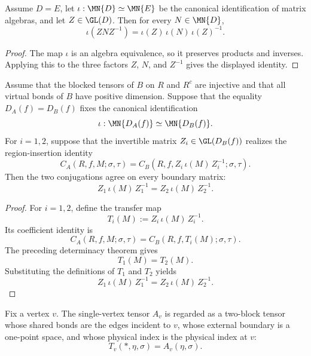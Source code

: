 \begin{theorem}
    \label{thm:peps_reindexAlgEquiv_gaugeConj}
    \leanok
    Assume \(D=E\), let \(\iota:\MN{D}\simeq\MN{E}\) be the canonical
    identification of matrix algebras, and let \(Z\in\GL(D)\).  Then for every
    \(N\in\MN{D}\),
    \[
        \iota(ZNZ^{-1})
        =
        \iota(Z)\,\iota(N)\,\iota(Z)^{-1}.
    \]
\end{theorem}
\begin{proof}\leanok
    The map \(\iota\) is an algebra equivalence, so it preserves products and
    inverses.  Applying this to the three factors \(Z\), \(N\), and \(Z^{-1}\)
    gives the displayed identity.
\end{proof}

\begin{theorem}
    \label{thm:peps_gaugeConj_eq_of_coeffIdentities}
    \leanok
    Assume that the blocked tensors of \(B\) on \(R\) and \(R^c\) are injective
    and that all virtual bonds of \(B\) have positive dimension.  Suppose that
    the equality \(D_A(f)=D_B(f)\) fixes the canonical identification
    \[
        \iota:\MN{D_A(f)}\simeq\MN{D_B(f)}.
    \]
    For \(i=1,2\), suppose that the invertible matrix \(Z_i\in\GL(D_B(f))\)
    realizes the region-insertion identity
    \[
        C_A(R,f,M;\sigma,\tau)
        =
        C_B(R,f,Z_i\,\iota(M)\,Z_i^{-1};\sigma,\tau).
    \]
    Then the two conjugations agree on every boundary matrix:
    \[
        Z_1\,\iota(M)\,Z_1^{-1}
        =
        Z_2\,\iota(M)\,Z_2^{-1}.
    \]
\end{theorem}
\begin{proof}\leanok
    For \(i=1,2\), define the transfer map
    \[
        T_i(M):=Z_i\,\iota(M)\,Z_i^{-1}.
    \]
    Its coefficient identity is
    \[
        C_A(R,f,M;\sigma,\tau)
        =
        C_B(R,f,T_i(M);\sigma,\tau).
    \]
    The preceding determinacy theorem gives
    \[
        T_1(M)=T_2(M).
    \]
    Substituting the definitions of \(T_1\) and \(T_2\) yields
    \[
        Z_1\,\iota(M)\,Z_1^{-1}
        =
        Z_2\,\iota(M)\,Z_2^{-1}.
    \]
\end{proof}

\begin{definition}%
    \label{def:peps_vertexTwoBlock}
    \leanok
    Fix a vertex $v$.  The single-vertex tensor $A_v$ is regarded as a
    two-block tensor whose shared bonds are the edges incident to $v$, whose
    external boundary is a one-point space, and whose physical index is the
    physical index at $v$:
    \[
        T_v(*,\eta,\sigma)=A_v(\eta,\sigma).
    \]
\end{definition}

